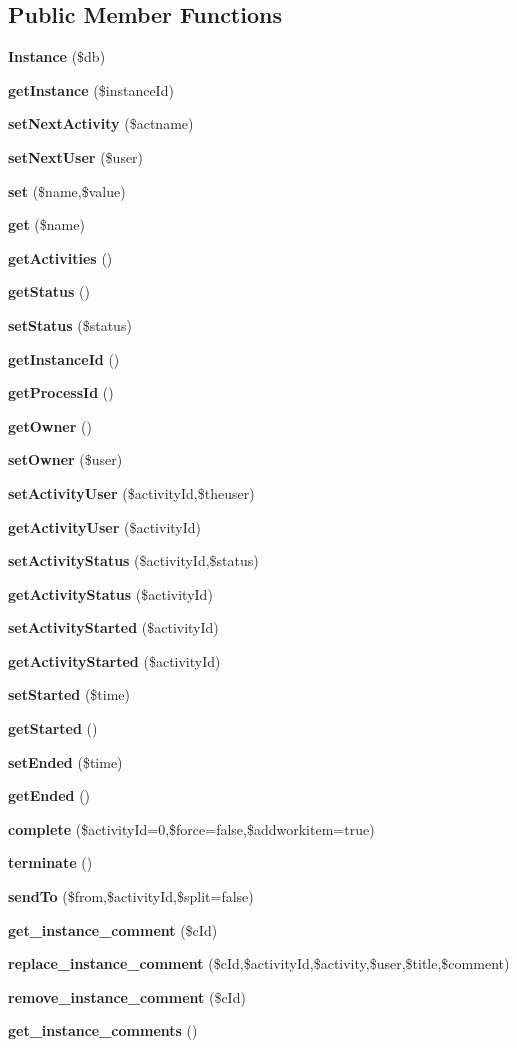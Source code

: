 \subsection*{Public Member Functions}
\begin{CompactItemize}
\item 
{}
{\bf Instance} (\$db)\label{classInstance_a0}

\item 
{\bf get\-Instance} (\$instance\-Id)
\item 
{\bf set\-Next\-Activity} (\$actname)
\item 
{\bf set\-Next\-User} (\$user)
\item 
{\bf set} (\$name,\$value)
\item 
{\bf get} (\$name)
\item 
{\bf get\-Activities} ()
\item 
{\bf get\-Status} ()
\item 
{\bf set\-Status} (\$status)
\item 
{\bf get\-Instance\-Id} ()
\item 
{\bf get\-Process\-Id} ()
\item 
{\bf get\-Owner} ()
\item 
{\bf set\-Owner} (\$user)
\item 
{\bf set\-Activity\-User} (\$activity\-Id,\$theuser)
\item 
{\bf get\-Activity\-User} (\$activity\-Id)
\item 
{\bf set\-Activity\-Status} (\$activity\-Id,\$status)
\item 
{\bf get\-Activity\-Status} (\$activity\-Id)
\item 
{\bf set\-Activity\-Started} (\$activity\-Id)
\item 
{\bf get\-Activity\-Started} (\$activity\-Id)
\item 
{\bf set\-Started} (\$time)
\item 
{\bf get\-Started} ()
\item 
{\bf set\-Ended} (\$time)
\item 
{\bf get\-Ended} ()
\item 
{\bf complete} (\$activity\-Id=0,\$force=false,\$addworkitem=true)
\item 
{\bf terminate} ()
\item 
{\bf send\-To} (\$from,\$activity\-Id,\$split=false)
\item 
{\bf get\_\-instance\_\-comment} (\$c\-Id)
\item 
{\bf replace\_\-instance\_\-comment} (\$c\-Id,\$activity\-Id,\$activity,\$user,\$title,\$comment)
\item 
{\bf remove\_\-instance\_\-comment} (\$c\-Id)
\item 
{\bf get\_\-instance\_\-comments} ()
\end{CompactItemize}
